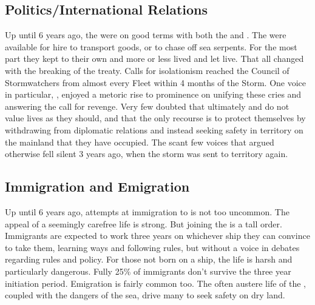 \documentclass[blue]{GL2020}
\begin{document}


\subsection*{Politics/International Relations}
Up until 6 years ago, the \pShip{} were on good terms with both the \pFarm{} and \pTech{}. The \pShippies{} were available for hire to transport goods, or to chase off sea serpents. For the most part they kept to their own and more or less lived and let live. That all changed with the breaking of the treaty. Calls for isolationism reached the Council of Stormwatchers from almost every Fleet within 4 months of the Storm. One voice in particular, \cLoud{\full}, enjoyed a metoric rise to prominence on unifying these cries and answering the call for revenge. Very few \pShippies{} doubted that ultimately \pFarm{} and \pTech{} do not value \pShip{} lives as they should, and that the only recourse is to protect themselves by withdrawing from diplomatic relations and instead seeking safety in territory on the mainland that they have occupied. The scant few voices that argued otherwise fell silent 3 years ago, when the storm was sent to \pShip{} territory again.

\subsection*{Immigration and Emigration}
Up until 6 years ago, attempts at immigration to \pShip{} is not too uncommon. The appeal of a seemingly carefree life is strong. But joining the \pShippies{} is a tall order. Immigrants are expected to work three years on whichever ship they can convince to take them, learning \pShip{} ways and  following \pShip{} rules, but without a voice in debates regarding rules and policy. For those not born on a ship, the life is harsh and particularly dangerous. Fully 25\% of immigrants don't survive the three year initiation period. Emigration is fairly common too. The often austere life of the \pShip{}, coupled with the dangers of the sea, drive many to seek safety on dry land.
\end{document}
